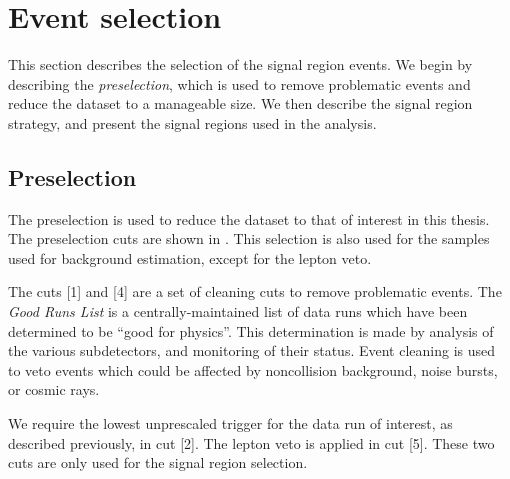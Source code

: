 

\section{Event selection}

This section describes the selection of the signal region events.
We begin by describing the \textit{preselection}, which is used to remove problematic events and reduce the dataset to a manageable size.
We then describe the signal region strategy, and present the signal regions used in the analysis.

\subsection{Preselection}

The preselection is used to reduce the dataset to that of interest in this thesis.
The preselection cuts are shown in .
This selection is also used for the samples used for background estimation, except for the lepton veto.

The cuts [1] and [4] are a set of cleaning cuts to remove problematic events.
The \textit{Good Runs List} is a centrally-maintained list of data runs which have been determined to be ``good for physics''.
This determination is made by analysis of the various subdetectors, and monitoring of their status.
Event cleaning is used to veto events which could be affected by noncollision background, noise bursts, or cosmic rays.


We require the lowest unprescaled \met trigger for the data run of interest, as described previously, in cut [2].
The lepton veto is applied in cut [5].
These two cuts are only used for the signal region selection.

